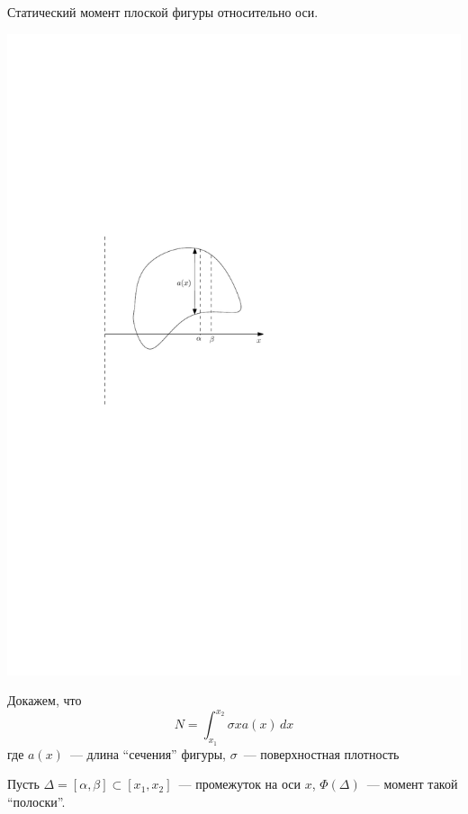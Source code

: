 \documentclass[12pt]{../../notes}
\begin{document}
\begin{exmp}
  Статический момент плоской фигуры
  относительно оси.
  
  \medskip

  \includegraphics[scale=0.85]{moment}
  
  Докажем, что
  \[ 
    N = \int_{x_1}^{x_2} \sigma xa \left( x \right) \, d  x 
  \]
  где $a \left( x \right)$~--- длина ``сечения''
  фигуры, $\sigma$~--- поверхностная
  плотность
  
  Пусть $\Delta = [ \alpha, \beta ] \subset [ x_1, x_2 ]$~--- промежуток на оси $x$, 
  $\Phi ( \Delta )$~--- момент такой ``полоски''.
  

\end{exmp}
\end{document}
